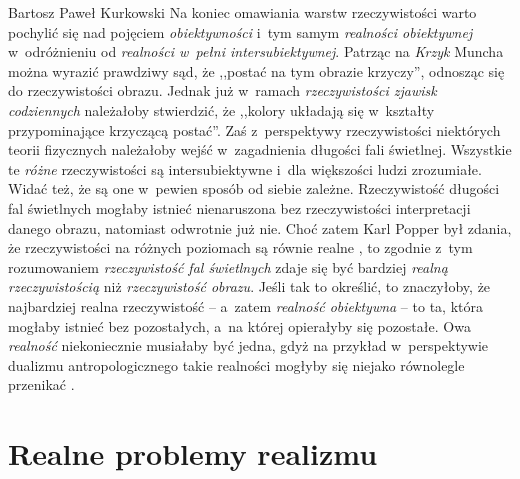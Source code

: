 \begin{artplenv}{Bartosz Paweł Kurkowski}
Na koniec omawiania warstw rzeczywistości warto pochylić się nad pojęciem \textit{obiektywności} i~tym samym
\textit{realności obiektywnej} w~odróżnieniu od \textit{realności w~pełni intersubiektywnej}. Patrząc na \textit{Krzyk} Muncha
można wyrazić prawdziwy sąd, że ,,postać na tym obrazie krzyczy'', odnosząc się do rzeczywistości obrazu. Jednak
już w~ramach \textit{rzeczywistości zjawisk codziennych} należałoby stwierdzić, że ,,kolory układają się w~kształty
przypominające krzyczącą postać''. Zaś z~perspektywy rzeczywistości niektórych teorii fizycznych należałoby
wejść w~zagadnienia długości fali świetlnej. Wszystkie te \textit{różne }rzeczywistości są intersubiektywne i~dla większości
ludzi zrozumiałe. Widać też, że są one w~pewien sposób od siebie zależne. Rzeczywistość długości fal świetlnych mogłaby
istnieć nienaruszona bez rzeczywistości interpretacji danego obrazu, natomiast odwrotnie już nie. Choć zatem Karl Popper był
zdania, że rzeczywistości na różnych poziomach są równie realne
\parencite[s.~265]{grobler_metodologia_2006},
to
zgodnie z~tym rozumowaniem \textit{rzeczywistość fal świetlnych} zdaje się być bardziej \textit{realną rzeczywistością}
niż \textit{rzeczywistość obrazu}. Jeśli tak to określić, to znaczyłoby, że najbardziej realna
rzeczywistość -- a~zatem\textit{ realność obiektywna} -- to ta, która mogłaby istnieć bez pozostałych, a~na której opierałyby się
pozostałe. Owa \textit{realność }niekoniecznie musiałaby być jedna, gdyż na przykład w~perspektywie dualizmu
antropologicznego takie realności mogłyby się niejako równolegle przenikać
\parencite[por.][]{judycki_swiadomosc_2004}.

\section{Realne problemy realizmu}


\end{artplenv}

